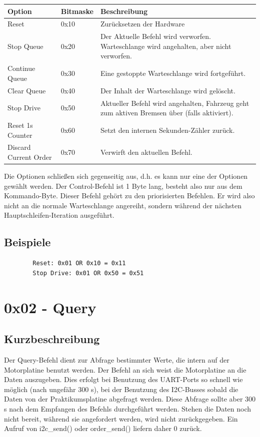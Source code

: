 \documentclass[a4paper]{article}
\begin{document}
	\begin{tabularx}{\linewidth}{|l|l|X|}
		\hline
		\textbf{Option} & \textbf{Bitmaske} & \textbf{Beschreibung} \\
		\hline
		\hline
		Reset 				& 0x10 				& Zurücksetzen der Hardware \\
		\hline
		Stop Queue			& 0x20				& Der Aktuelle Befehl wird verworfen. Warteschlange wird angehalten, aber nicht verworfen. \\
		\hline
		Continue Queue		& 0x30				& Eine gestoppte Warteschlange wird fortgeführt. \\
		\hline
		Clear Queue			& 0x40				& Der Inhalt der Warteschlange wird gelöscht. \\
		\hline
		Stop Drive			& 0x50				& Aktueller Befehl wird angehalten, Fahrzeug geht zum aktiven Bremsen über (falls aktiviert). \\
		\hline
		Reset 1s Counter	& 0x60				& Setzt den internen Sekunden-Zähler zurück. \\
		\hline
		Discard Current Order& 0x70				& Verwirft den aktuellen Befehl. \\
		\hline
	\end{tabularx}

	Die Optionen schließen sich gegenseitig aus, d.h. es kann nur eine der
	Optionen gewählt werden. Der Control-Befehl ist 1 Byte lang, besteht also
	nur aus dem Kommando-Byte. Dieser Befehl gehört zu den priorisierten
	Befehlen. Er wird also nicht an die normale Warteschlange angereiht,
	sondern während der nächsten Hauptschleifen-Iteration ausgeführt.


	\subsection{Beispiele}
	
	\begin{verbatim}
		Reset: 0x01 OR 0x10 = 0x11
		Stop Drive: 0x01 OR 0x50 = 0x51
	\end{verbatim}
	
	\pagebreak

	\section{0x02 - Query}

	\subsection{Kurzbeschreibung}

	Der Query-Befehl dient zur Abfrage bestimmter Werte, die intern auf der
	Motorplatine benutzt werden. Der Befehl an sich weist die Motorplatine
	an die Daten auszugeben. Dies erfolgt bei Benutzung des UART-Ports so
	schnell wie möglich (nach ungefähr 300 \textmu{}s), bei der Benutzung
	des I2C-Busses sobald die Daten von der Praktikumsplatine abgefragt
	werden. Diese Abfrage sollte aber 300 \textmu{}s nach dem Empfangen
	des Befehls durchgeführt werden. Stehen die Daten noch nicht bereit,
	während sie angefordert werden, wird nicht zurückgegeben. Ein Aufruf
	von i2c\_send() oder order\_send() liefern daher 0 zurück.
\end{document}
